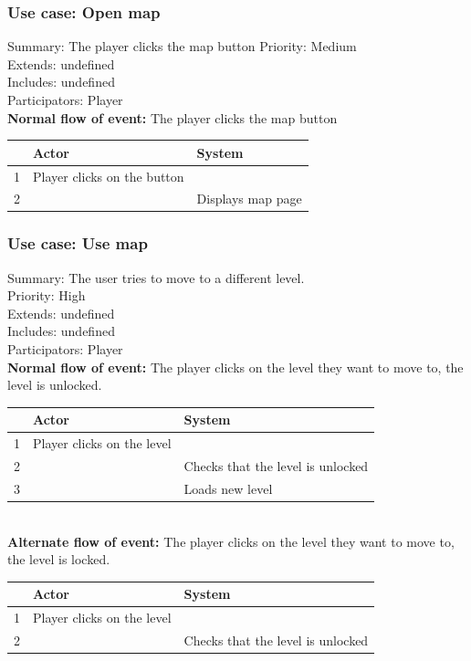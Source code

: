 \documentclass{article}
\begin{document}
\subsubsection{Use case: Open map}
Summary: The player clicks the map button
Priority: Medium \\
Extends: undefined\\
Includes: undefined\\
Participators: Player \\
\textbf{Normal flow of event:} The player clicks the map button\\
\begin{tabular}{|c|l|l|} \hline
      & Actor & System \\ \hline
    1 & Player clicks on the button & \\ \hline
    2 & & Displays map page \\ \hline
\end{tabular} 

\subsubsection{Use case: Use map}
Summary: The user tries to move to a different level.\\
Priority: High\\
Extends: undefined\\
Includes: undefined\\
Participators: Player \\
\textbf{Normal flow of event:} The player clicks on the level they want to move to, the level is unlocked.\\
\begin{tabular}{|c|l|l|} \hline
      & Actor & System \\ \hline
    1 & Player clicks on the level & \\ \hline
    2 & & Checks that the level is unlocked \\ \hline
    3 & & Loads new level \\ \hline
\end{tabular} \\
\textbf{Alternate flow of event:} The player clicks on the level they want to move to, the level is locked.
\vspace{1 mm}\\
\begin{tabular}{|c|l|l|} \hline
      & Actor & System \\ \hline
    1 & Player clicks on the level & \\ \hline
    2 & & Checks that the level is unlocked \\ \hline
\end{tabular} 
\end{document}
